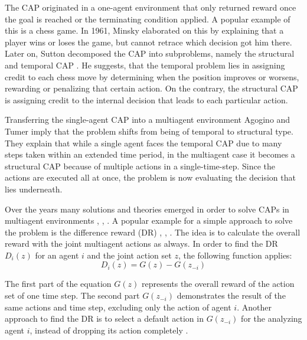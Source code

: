 The CAP originated in a one-agent environment that only returned reward once the goal is reached or the terminating condition applied. A popular example of this is a chess game. In 1961, Minsky \cite{mi61} elaborated on this by explaining that a player wins or loses the game, but cannot retrace which decision got him there. Later on, Sutton decomposed the CAP into subproblems, namely the structural and temporal CAP \cite{su84}. He suggests, that the temporal problem lies in assigning credit to each chess move by determining when the position improves or worsens, rewarding or penalizing that certain action. On the contrary, the structural CAP is assigning credit to the internal decision that leads to each particular action.

Transferring the single-agent CAP into a multiagent environment Agogino and Tumer \cite{agtu04} imply that the problem shifts from being of temporal to structural type. They explain that while a single agent faces the temporal CAP due to many steps taken within an extended time period, in the multiagent case it becomes a structural CAP because of multiple actions in a single-time-step. Since the actions are executed all at once, the problem is now evaluating the decision that lies underneath.

Over the years many solutions and theories emerged in order to solve CAPs in multiagent environments \cite{rabe09}, \cite{zhli20}, \cite{agtu04}. A popular example for a simple approach to solve the problem is the difference reward (DR) \cite{ngku18}, \cite{yltu14}, \cite{agtu04}. The idea is to calculate the overall reward with the joint multiagent actions as always. In order to find the DR $D_i(z)$ for an agent $i$ and the joint action set $z$, the following function applies:
\begin{equation}\label{eq:dr}
    D_i(z) = G(z) - G(z_{-i})
\end{equation}

The first part of the equation $G(z)$ represents the overall reward of the action set of one time step. The second part $G(z_{-i})$ demonstrates the result of the same actions and time step, excluding only the action of agent $i$. Another approach to find the DR is to select a default action in $G(z_{-i})$ for the analyzing agent $i$, instead of dropping its action completely \cite{vega96}.


